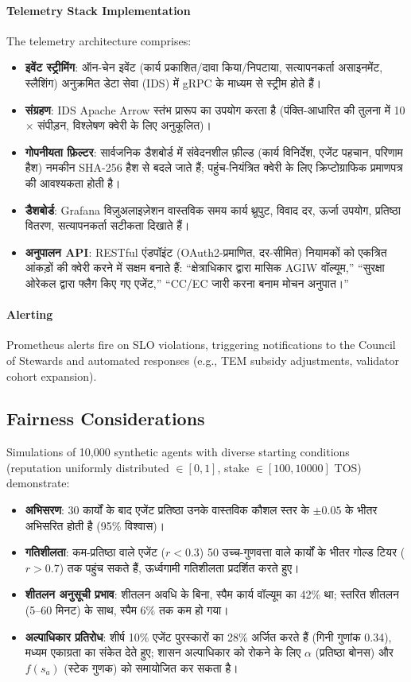 \documentclass[11pt]{article}
\begin{document}
\paragraph{Telemetry Stack Implementation} The telemetry architecture comprises:
\begin{itemize}[noitemsep]
  \item \textbf{इवेंट स्ट्रीमिंग}: ऑन-चेन इवेंट (कार्य प्रकाशित/दावा किया/निपटाया, सत्यापनकर्ता असाइनमेंट, स्लैशिंग) अनुक्रमित डेटा सेवा (IDS) में gRPC के माध्यम से स्ट्रीम होते हैं।
  \item \textbf{संग्रहण}: IDS Apache Arrow स्तंभ प्रारूप का उपयोग करता है (पंक्ति-आधारित की तुलना में 10$\times$ संपीड़न, विश्लेषण क्वेरी के लिए अनुकूलित)।
  \item \textbf{गोपनीयता फ़िल्टर}: सार्वजनिक डैशबोर्ड में संवेदनशील फ़ील्ड (कार्य विनिर्देश, एजेंट पहचान, परिणाम हैश) नमकीन SHA-256 हैश से बदले जाते हैं; पहुंच-नियंत्रित क्वेरी के लिए क्रिप्टोग्राफिक प्रमाणपत्र की आवश्यकता होती है।
  \item \textbf{डैशबोर्ड}: Grafana विज़ुअलाइज़ेशन वास्तविक समय कार्य थ्रूपुट, विवाद दर, ऊर्जा उपयोग, प्रतिष्ठा वितरण, सत्यापनकर्ता सटीकता दिखाते हैं।
  \item \textbf{अनुपालन API}: RESTful एंडपॉइंट (OAuth2-प्रमाणित, दर-सीमित) नियामकों को एकत्रित आंकड़ों की क्वेरी करने में सक्षम बनाते हैं: ``क्षेत्राधिकार द्वारा मासिक AGIW वॉल्यूम,'' ``सुरक्षा ओरेकल द्वारा फ्लैग किए गए एजेंट,'' ``CC/EC जारी करना बनाम मोचन अनुपात।''
\end{itemize}

\paragraph{Alerting} Prometheus alerts fire on SLO violations, triggering notifications to the Council of Stewards and automated responses (e.g., TEM subsidy adjustments, validator cohort expansion).

\subsection{Fairness Considerations}
Simulations of 10,000 synthetic agents with diverse starting conditions (reputation uniformly distributed $\in [0,1]$, stake $\in [100, 10000]$ TOS) demonstrate:
\begin{itemize}[noitemsep]
  \item \textbf{अभिसरण}: 30 कार्यों के बाद एजेंट प्रतिष्ठा उनके वास्तविक कौशल स्तर के $\pm0.05$ के भीतर अभिसरित होती है (95\% विश्वास)।
  \item \textbf{गतिशीलता}: कम-प्रतिष्ठा वाले एजेंट ($r<0.3$) 50 उच्च-गुणवत्ता वाले कार्यों के भीतर गोल्ड टियर ($r>0.7$) तक पहुंच सकते हैं, ऊर्ध्वगामी गतिशीलता प्रदर्शित करते हुए।
  \item \textbf{शीतलन अनुसूची प्रभाव}: शीतलन अवधि के बिना, स्पैम कार्य वॉल्यूम का 42\% था; स्तरित शीतलन (5--60 मिनट) के साथ, स्पैम 6\% तक कम हो गया।
  \item \textbf{अल्पाधिकार प्रतिरोध}: शीर्ष 10\% एजेंट पुरस्कारों का 28\% अर्जित करते हैं (गिनी गुणांक 0.34), मध्यम एकाग्रता का संकेत देते हुए; शासन अल्पाधिकार को रोकने के लिए $\alpha$ (प्रतिष्ठा बोनस) और $f(s_a)$ (स्टेक गुणक) को समायोजित कर सकता है।
\end{itemize}
\end{document}

